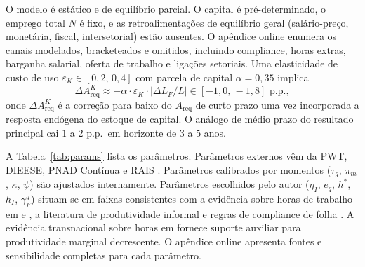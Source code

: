 \documentclass[10pt,twocolumn]{article}
\begin{document}
O modelo \'e est\'atico e de equil\'ibrio parcial. O capital \'e pr\'e-determinado, o emprego total $N$ \'e fixo, e as retroalimenta\c{c}\~oes de equil\'ibrio geral (sal\'ario-pre\c{c}o, monet\'aria, fiscal, intersetorial) est\~ao ausentes. O ap\^endice online enumera os canais modelados, bracketeados e omitidos, incluindo compliance, horas extras, barganha salarial, oferta de trabalho e liga\c{c}\~oes setoriais. Uma elasticidade de custo de uso $\varepsilon_K\in[0{,}2,\,0{,}4]$ \citep{Caballero1999} com parcela de capital $\alpha=0{,}35$ implica
\begin{equation}\label{eq:pe_bound}
\Delta A_{\text{req}}^{K}\approx -\alpha\cdot\varepsilon_K\cdot|\Delta L_F/L|\in[-1{,}0,\,-1{,}8]\text{ p.p.},
\end{equation}
onde $\Delta A_{\text{req}}^{K}$ \'e a corre\c{c}\~ao para baixo do $A_{\text{req}}$ de curto prazo uma vez incorporada a resposta end\'ogena do estoque de capital. O an\'alogo de m\'edio prazo do resultado principal cai $1$ a $2$ p.p.\ em horizonte de $3$ a $5$ anos.

A Tabela~\ref{tab:params} lista os par\^ametros. Par\^ametros externos v\^em da PWT, DIEESE, PNAD Cont\'inua e RAIS \citep{PNAD2025,RAIS2022,DIEESE2024,PWT2025}. Par\^ametros calibrados por momentos ($\tau_g$, $\pi_m$, $\kappa$, $\psi$) s\~ao ajustados internamente. Par\^ametros escolhidos pelo autor ($\eta_I$, $e_q$, $h^*$, $h_I$, $\gamma_F^g$) situam-se em faixas consistentes com a evid\^encia sobre horas de trabalho em \citet{Pencavel2015} e \citet{CollewetSauermann2017}, a literatura de produtividade informal \citep{LaPortaShleifer2014} e regras de compliance de folha \citep{BrasilLei8212,ReceitaESocialRural2021}. A evid\^encia transnacional sobre horas em \citet{BickFuchsSchundelnLagakos2018} fornece suporte auxiliar para produtividade marginal decrescente. O ap\^endice online apresenta fontes e sensibilidade completas para cada par\^ametro.
\end{document}
